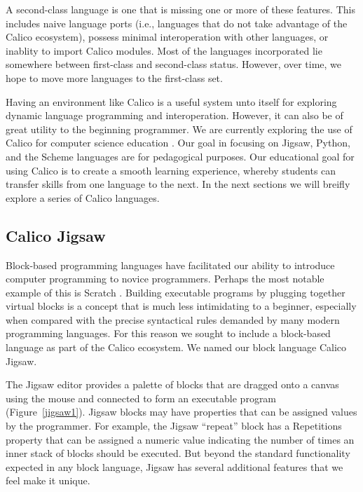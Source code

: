 \documentclass[preprint]{sigplanconf}
\begin{document}
A second-class language is one that is missing one or more of these
features. This includes naive language ports (i.e., languages that do
not take advantage of the Calico ecosystem), possess minimal
interoperation with other languages, or inablity to import Calico
modules. Most of the languages incorporated lie somewhere between
first-class and second-class status. However, over time, we hope to
move more languages to the first-class set.

Having an environment like Calico is a useful system unto itself for
exploring dynamic language programming and interoperation. However, it
can also be of great utility to the beginning programmer. We are
currently exploring the use of Calico for computer science education
\cite{blank-etal-2012, blank-ohara-2013}. Our goal in focusing on
Jigsaw, Python, and the Scheme languages are for pedagogical
purposes. Our educational goal for using Calico is to create a smooth
learning experience, whereby students can transfer skills from one
language to the next. In the next sections we will breifly explore a
series of Calico languages.

\subsection{Calico Jigsaw}

Block-based programming languages have facilitated our ability to
introduce computer programming to novice programmers. Perhaps the most
notable example of this is Scratch \cite{scratch}. Building
executable programs by plugging together virtual blocks is a concept
that is much less intimidating to a beginner, especially when
compared with the precise syntactical rules demanded by many modern
programming languages. For this reason we sought to include a
block-based language as part of the Calico ecosystem. We named our
block language Calico Jigsaw.

The Jigsaw editor provides a palette of blocks that are dragged onto a
canvas using the mouse and connected to form an executable program
(Figure~\ref{jigsaw1}). Jigsaw blocks may have properties that can be assigned
values by the programmer. For example, the Jigsaw ``repeat'' block has
a Repetitions property that can be assigned a numeric value indicating
the number of times an inner stack of blocks should be executed. But
beyond the standard functionality expected in any block language,
Jigsaw has several additional features that we feel make it unique.
\end{document}

